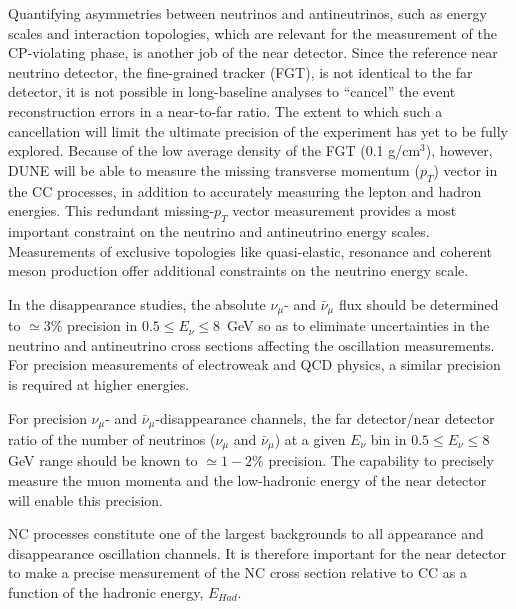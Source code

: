 Quantifying asymmetries between neutrinos and antineutrinos, such as
energy scales and interaction topologies, which are relevant for the
measurement of the CP-violating phase, is another job of the near
detector.
%
Since the reference near neutrino detector, the fine-grained tracker
(FGT), is not identical to the far detector, it is not possible in
long-baseline analyses to ``cancel'' the event reconstruction errors
in a near-to-far ratio.  The extent to which such a cancellation will
limit the ultimate precision of the experiment has yet to be fully
explored.  Because of the low average density of the FGT (0.1
g/cm$^3$), however, DUNE will be able to measure the missing
transverse momentum ($p_{T}$) vector in the CC processes, in addition
to accurately measuring the lepton and hadron energies.  This
redundant missing-$p_{T}$ vector measurement provides a most important
constraint on the neutrino and antineutrino energy
scales. Measurements of exclusive topologies like quasi-elastic,
resonance and coherent meson production offer additional constraints
on the neutrino energy scale.


In the disappearance studies, the absolute $\nu_\mu$- and $\bar
\nu_\mu$ flux should be determined to $\simeq 3\%$ precision in $0.5
\leq E_\nu \leq 8$~GeV so as to eliminate uncertainties in the
neutrino and antineutrino cross sections affecting the oscillation
measurements. For precision measurements of electroweak and QCD
physics, a similar precision is required at higher energies.


 
For precision $\nu_\mu$- and $\bar \nu_\mu$-disappearance channels,
the far detector/near detector ratio of the number of neutrinos
($\nu_\mu$ and $\bar \nu_\mu$) at a given $E_\nu$ bin in $0.5 \leq
E_\nu \leq 8$ GeV range should be known to $\simeq 1-2\%$
precision. The capability to precisely measure the muon momenta and
the low-hadronic energy of the near detector will enable this
precision.


NC processes constitute one of the largest backgrounds to all
appearance and disappearance oscillation channels. It is therefore
important for the near detector to make a precise measurement of the
NC cross section relative to CC as a function of the hadronic energy,
$E_{Had}$.


